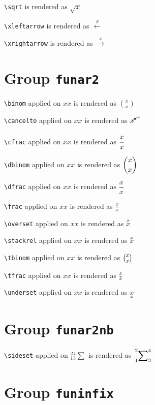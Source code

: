 \texttt{\textbackslash sqrt} is rendered as $\sqrt{x}$

\texttt{\textbackslash xleftarrow} is rendered as $\xleftarrow{x}$

\texttt{\textbackslash xrightarrow} is rendered as $\xrightarrow{x}$

\section{ Group \texttt{fun\textunderscore ar2}}

\texttt{\textbackslash binom} applied on ${x}{x}$ is rendered as $\binom{x}{x}$

\texttt{\textbackslash cancelto} applied on ${x}{x}$ is rendered as $\cancelto{x}{x}$

\texttt{\textbackslash cfrac} applied on ${x}{x}$ is rendered as $\cfrac{x}{x}$

\texttt{\textbackslash dbinom} applied on ${x}{x}$ is rendered as $\dbinom{x}{x}$

\texttt{\textbackslash dfrac} applied on ${x}{x}$ is rendered as $\dfrac{x}{x}$

\texttt{\textbackslash frac} applied on ${x}{x}$ is rendered as $\frac{x}{x}$





\texttt{\textbackslash overset} applied on ${x}{x}$ is rendered as $\overset{x}{x}$



\texttt{\textbackslash stackrel} applied on ${x}{x}$ is rendered as $\stackrel{x}{x}$

\texttt{\textbackslash tbinom} applied on ${x}{x}$ is rendered as $\tbinom{x}{x}$

\texttt{\textbackslash tfrac} applied on ${x}{x}$ is rendered as $\tfrac{x}{x}$

\texttt{\textbackslash underset} applied on ${x}{x}$ is rendered as $\underset{x}{x}$

\section{ Group \texttt{fun\textunderscore ar2nb}}

\texttt{\textbackslash sideset} applied on ${_1^2}{_3^4}\sum$ is rendered as $\sideset{_1^2}{_3^4}\sum$

\section{ Group \texttt{fun\textunderscore infix}}

